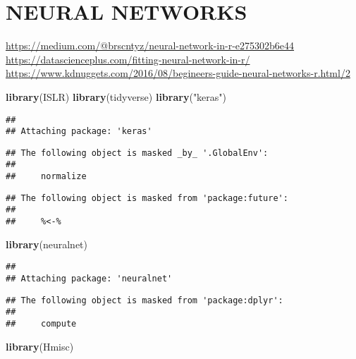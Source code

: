 \documentclass[
]{article}
\newenvironment{Shaded}{\begin{snugshade}}{\end{snugshade}}
\newcommand{\KeywordTok}[1]{\textcolor[rgb]{0.13,0.29,0.53}{\textbf{#1}}}
\newcommand{\NormalTok}[1]{#1}
\newcommand{\StringTok}[1]{\textcolor[rgb]{0.31,0.60,0.02}{#1}}
\begin{document}
\hypertarget{neural-networks}{%
\section{NEURAL NETWORKS}\label{neural-networks}}

\url{https://medium.com/@brscntyz/neural-network-in-r-e275302b6e44}
\url{https://datascienceplus.com/fitting-neural-network-in-r/}
\url{https://www.kdnuggets.com/2016/08/begineers-guide-neural-networks-r.html/2}

\begin{Shaded}
\begin{Highlighting}[]
\KeywordTok{library}\NormalTok{(ISLR)}
\KeywordTok{library}\NormalTok{(tidyverse)}
\KeywordTok{library}\NormalTok{(}\StringTok{"keras"}\NormalTok{)}
\end{Highlighting}
\end{Shaded}

\begin{verbatim}
## 
## Attaching package: 'keras'
\end{verbatim}

\begin{verbatim}
## The following object is masked _by_ '.GlobalEnv':
## 
##     normalize
\end{verbatim}

\begin{verbatim}
## The following object is masked from 'package:future':
## 
##     %<-%
\end{verbatim}

\begin{Shaded}
\begin{Highlighting}[]
\KeywordTok{library}\NormalTok{(neuralnet)}
\end{Highlighting}
\end{Shaded}

\begin{verbatim}
## 
## Attaching package: 'neuralnet'
\end{verbatim}

\begin{verbatim}
## The following object is masked from 'package:dplyr':
## 
##     compute
\end{verbatim}

\begin{Shaded}
\begin{Highlighting}[]
\KeywordTok{library}\NormalTok{(Hmisc)}
\end{Highlighting}
\end{Shaded}
\end{document}
